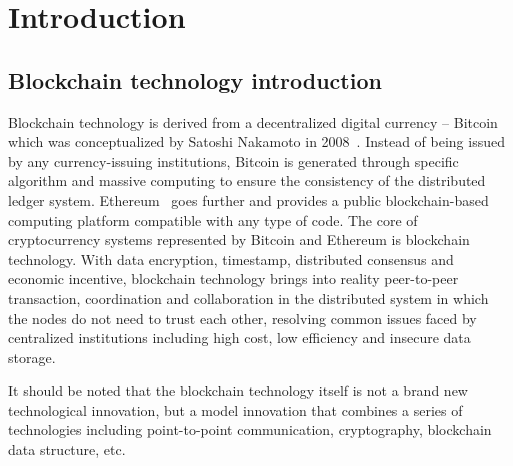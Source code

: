\section{Introduction}

\subsection{Blockchain technology introduction}
Blockchain technology is derived from a decentralized digital currency – Bitcoin which was conceptualized by Satoshi Nakamoto in 2008~\cite{Nakamoto2008}. Instead of being issued by any currency-issuing institutions, Bitcoin is generated through specific algorithm and massive computing to ensure the consistency of the distributed ledger system. Ethereum~\cite{buterin2014ethereum} goes further and provides a public blockchain-based computing platform compatible with any type of code. The core of cryptocurrency systems represented by Bitcoin and Ethereum is blockchain technology. With data encryption, timestamp, distributed consensus and economic incentive, blockchain technology brings into reality peer-to-peer transaction, coordination and collaboration in the distributed system in which the nodes do not need to trust each other, resolving common issues faced by centralized institutions including high cost, low efficiency and insecure data storage.

It should be noted that the blockchain technology itself is not a brand new technological innovation, but a model innovation that combines a series of technologies including point-to-point communication, cryptography, blockchain data structure, etc.

